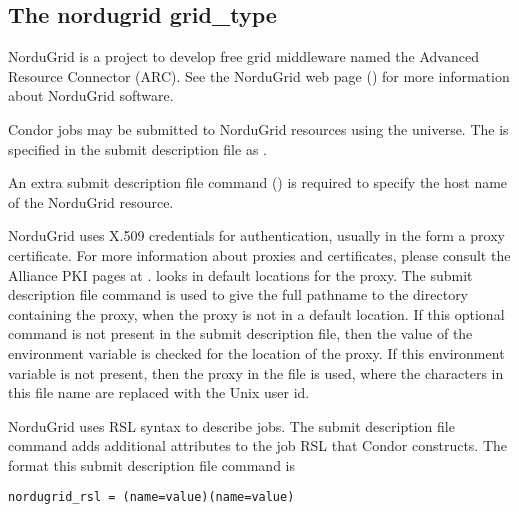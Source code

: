 
\subsection{\label{sec:NorduGrid}The nordugrid grid\_type }

NorduGrid is a project to develop free grid middleware named
the Advanced  Resource Connector (ARC).
See the NorduGrid web page ()
for more information about NorduGrid software.

Condor jobs may be submitted to
NorduGrid resources using the  universe.
The  is specified in the submit description
file as .

An extra submit description file command ()
is required to specify the host name of the NorduGrid resource.

NorduGrid uses X.509 credentials for authentication,
usually in the form a proxy certificate. 
For more information about proxies and certificates,
please consult the Alliance PKI pages at
.
 looks in default locations for the proxy. 
The submit description file command 
is used to give the full pathname to the directory containing the proxy,
when the proxy is not in a default location.
If this optional command is not present in the submit description file,
then the value of the environment variable
 is checked for the location of the proxy.
If this environment variable is not present, then 
the proxy in the file
 is used,
where the characters \verb@XXXX@ in this file name are
replaced with the Unix user id.

NorduGrid uses RSL syntax to describe jobs.
The submit description file command
adds additional attributes to the job RSL that Condor
constructs. 
The format this submit description file command is
\begin{verbatim}
nordugrid_rsl = (name=value)(name=value)
\end{verbatim}
